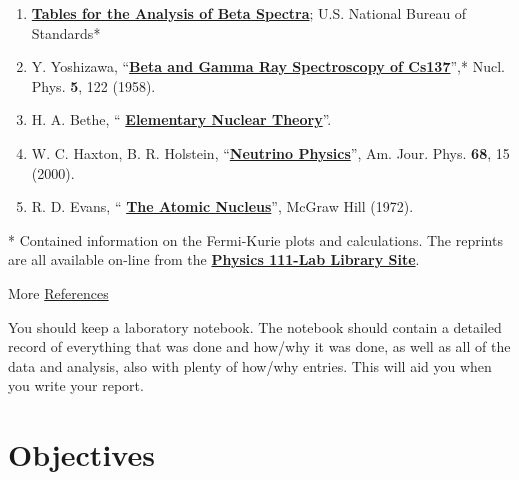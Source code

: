 \documentclass{../lab}
\begin{document}
\begin{enumerate}
    \item \href{http://physics111.lib.berkeley.edu/Physics111/Reprints/BRA/04-Table\_for\_Analysis\_of\_Beta\_Spectra.pdf}{\textbf{Tables for the Analysis of Beta Spectra}}; U.S. National Bureau of Standards*

    \item Y. Yoshizawa, ``\href{http://dx.doi.org/10.1016/0029-5582(58)90011-7}{\textbf{Beta and Gamma Ray Spectroscopy of Cs137}}'',* Nucl. Phys. \textbf{5}, 122 (1958).

    \item H. A. Bethe, `` \href{http://physics111.lib.berkeley.edu/Physics111/Reprints/BRA/05-Elementary\_Nuclear\_Theory.pdf}{\textbf{Elementary Nuclear Theory}}''.

    \item W. C. Haxton, B. R. Holstein, ``\href{http://scitation.aip.org/content/aapt/journal/ajp/68/1/10.1119/1.19368}{\textbf{Neutrino Physics}}'', Am. Jour. Phys. \textbf{68}, 15 (2000).

    \item R. D. Evans, `` \href{http://physics111.lib.berkeley.edu/Physics111/Reprints/R.D.Evans\%20Atomic\%20Nucleus/The\%20Atomic\%20Nucleus\%20Evans\%20full\%20text.pdf}{\textbf{The Atomic Nucleus}}'', McGraw Hill (1972).

\end{enumerate}

* Contained information on the Fermi-Kurie plots and calculations. The reprints are all available on-line from the \href{http://physics111.lib.berkeley.edu/Physics111/Reprints/BRA/BRA\_index.html}{\textbf{Physics 111-Lab Library Site}}.

More \hyperref[sec:References]{References}

You should keep a laboratory notebook. The notebook should contain a detailed record of everything that was done and how/why it was done, as well as all of the data and analysis, also with plenty of how/why entries. This will aid you when you write your report.

\section{Objectives}
\end{document}

